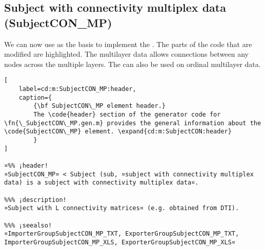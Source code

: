 \documentclass{tufte-handout}
\begin{document}
\clearpage
\subsection{Subject with connectivity multiplex data (SubjectCON\_MP)}

We can now use  as the basis to implement the . The parts of the code that are modified are highlighted.
The multilayer data allows connections between any nodes across the multiple layers. The  can also be used on ordinal multilayer data.
\begin{lstlisting}[
	label=cd:m:SubjectCON_MP:header,
	caption={
		{\bf SubjectCON\_MP element header.}
		The \code{header} section of the generator code for \fn{\_SubjectCON\_MP.gen.m} provides the general information about the \code{SubjectCON\_MP} element. \expand{cd:m:SubjectCON:header}
		}
]

¤%% ¡header!
¤SubjectCON_MP¤ < Subject (sub, ¤subject with connectivity multiplex data) is a subject with connectivity multiplex data¤.

%%% ¡description!
¤Subject with L connectivity matrices¤ (e.g. obtained from DTI).

%%% ¡seealso!
¤ImporterGroupSubjectCON_MP_TXT, ExporterGroupSubjectCON_MP_TXT, ImporterGroupSubjectCON_MP_XLS, ExporterGroupSubjectCON_MP_XLS¤
\end{lstlisting}
\end{document}
